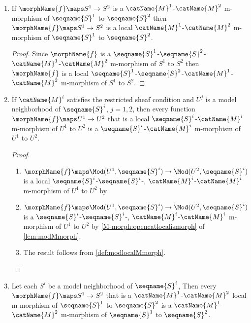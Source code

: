 \documentclass{article}
\begin{document}
\begin{corollary}
\begin{enumerate}
\item
\label{M-morph:catmorphislocal}
If $\morphName{f} \maps S^1 \to S^2$ is a $\catName{M}^1$-$\catName{M}^2$
m-morphism of $\seqname{S}^1$ to $\seqname{S}^2$ then
$\morphName{f} \maps S^1 \to S^2$ is a local
$\catName{M}^1$-$\catName{M}^2$ m-morphism of $\seqname{S}^1$ to
$\seqname{S}^2$.

\begin{proof}
Since $\morphName{f}$ is a
$\seqname{S}^1$-$\seqname{S}^2$-$\catName{M}^1$-$\catName{M}^2$
m-morphism of $S^1$ to $S^2$ then $\morphName{f}$ is a local
$\seqname{S}^1$-$\seqname{S}^2$-$\catName{M}^1$-$\catName{M}^2$
m-morphism of $S^1$ to $S^2$.
\end{proof}

\item
\label{M-morph:subcatlocalismorph}
If $\catName{M}^i$ satisfies the restricted sheaf condition and $U^j$ is
a model neighborhood of $\seqname{S}^i$, $j=1,2$, then every function
$\morphName{f} \maps U^1 \to U^2$ that is a local
$\seqname{S}^i$-$\catName{M}^i$ m-morphism of $U^1$ to $U^2$ is a
$\seqname{S}^i$-$\catName{M}^i$ m-morphism of $U^1$ to $U^2$.

\begin{proof}
\leavevmode
\begin{enumerate}
\item
$
  \morphName{f} \maps
  \Mod(U^1,\seqname{S}^i) \to
  \Mod(U^2,\seqname{S}^i)
$
is a local
\nobreaks%
  {
    {$\seqname{S}^i$-$\seqname{S}^i$-},
    {$\catName{M}^i$-$\catName{M}^i$}
  }
m-morphism of $U^1$ to $U^2$ by 

\item
$
  \morphName{f} \maps
  \Mod(U^1,\seqname{S}^i) \to
  \Mod(U^2,\seqname{S}^i)
$
is a
\nobreaks%
  {
    {$\seqname{S}^i$-$\seqname{S}^i$-},
    {$\catName{M}^i$-$\catName{M}^i$}
  }
m-morphism of $U^1$ to $U^2$ by \cref{M-morph:opencatlocalismorph} of
{
  \showlabelsinline
  \cref{lem:modMmorph}.
}

\item
The result follows from \cref{def:modlocalMmorph}.
\end{enumerate}
\end{proof}

\item
\label{M-morph:catlocalismorph}
Let each $S^i$ be a model neighborhood of $\seqname{S}^i$, Then every
$\morphName{f} \maps S^1 \to S^2$ that is a
$\catName{M}^1$-$\catName{M}^2$ local m-morphism of $\seqname{S}^1$ to
$\seqname{S}^2$ is a $\catName{M}^1$-$\catName{M}^2$ m-morphism
of $\seqname{S}^1$ to $\seqname{S}^2$.


\end{enumerate}
\end{corollary}
\end{document}
